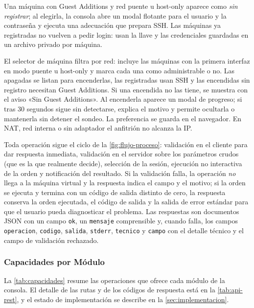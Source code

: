 Una máquina con Guest Additions y red puente u host-only aparece como
\emph{sin registrar}; al elegirla, la consola abre un modal flotante para
el usuario y la contraseña y ejecuta una adecuación que prepara SSH. Las
máquinas ya registradas no vuelven a pedir login: usan la llave y las
credenciales guardadas en un archivo privado por máquina.

El selector de máquina filtra por red: incluye las máquinas con la primera
interfaz en modo puente u host-only y marca cada una como administrable o
no. Las apagadas se listan para encenderlas, las registradas usan SSH y las
encendidas sin registro necesitan Guest Additions. Si una encendida no las
tiene, se muestra con el aviso «Sin Guest Additions». Al encenderla aparece
un modal de progreso; si tras 30 segundos sigue sin detectarse, explica el
motivo y permite ocultarla o mantenerla sin detener el sondeo. La
preferencia se guarda en el navegador. En NAT,
red interna o sin adaptador el anfitrión no alcanza la IP.

Toda operación sigue el ciclo de la \cref{fig:flujo-proceso}: validación
en el cliente para dar respuesta inmediata, validación en el servidor
sobre los parámetros crudos (que es la que realmente decide), selección
de la sesión, ejecución no interactiva de la orden y notificación del
resultado. Si la validación falla, la operación \emph{no} llega a la
máquina virtual y la respuesta indica el campo y el motivo; si la orden
se ejecuta y termina con un código de salida distinto de cero, la
respuesta conserva la orden ejecutada, el código de salida y la salida de
error estándar para que el usuario pueda diagnosticar el problema. Las
respuestas son documentos JSON con un campo \texttt{ok}, un
\texttt{mensaje} comprensible y, cuando falla, los campos
\texttt{operacion}, \texttt{codigo}, \texttt{salida}, \texttt{stderr},
\texttt{tecnico} y \texttt{campo} con el detalle técnico y el campo de
validación rechazado.

\subsubsection{Capacidades por Módulo}
\label{sec:capacidades}

La \cref{tab:capacidades} resume las operaciones que ofrece cada módulo
de la consola. El detalle de las rutas y de los códigos de respuesta está
en la \cref{tab:api-rest}, y el estado de implementación se describe en la
\cref{sec:implementacion}.

